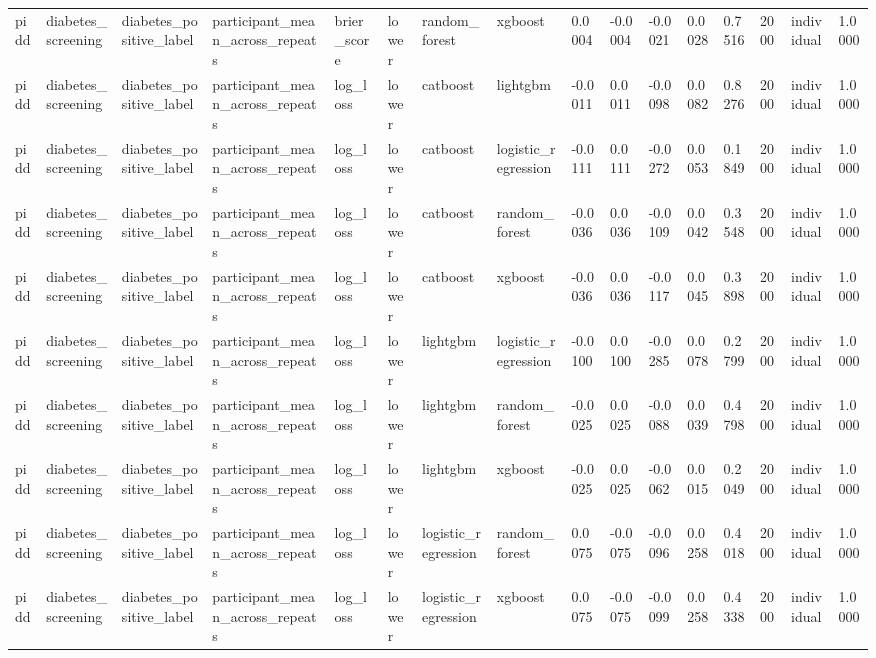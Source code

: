 \begin{tabular}{llllllllllllllll}
pidd & diabetes\_screening & diabetes\_positive\_label & participant\_mean\_across\_repeats & brier\_score & lower & random\_forest & xgboost & 0.0004 & -0.0004 & -0.0021 & 0.0028 & 0.7516 & 2000 & individual & 1.0000 \\
pidd & diabetes\_screening & diabetes\_positive\_label & participant\_mean\_across\_repeats & log\_loss & lower & catboost & lightgbm & -0.0011 & 0.0011 & -0.0098 & 0.0082 & 0.8276 & 2000 & individual & 1.0000 \\
pidd & diabetes\_screening & diabetes\_positive\_label & participant\_mean\_across\_repeats & log\_loss & lower & catboost & logistic\_regression & -0.0111 & 0.0111 & -0.0272 & 0.0053 & 0.1849 & 2000 & individual & 1.0000 \\
pidd & diabetes\_screening & diabetes\_positive\_label & participant\_mean\_across\_repeats & log\_loss & lower & catboost & random\_forest & -0.0036 & 0.0036 & -0.0109 & 0.0042 & 0.3548 & 2000 & individual & 1.0000 \\
pidd & diabetes\_screening & diabetes\_positive\_label & participant\_mean\_across\_repeats & log\_loss & lower & catboost & xgboost & -0.0036 & 0.0036 & -0.0117 & 0.0045 & 0.3898 & 2000 & individual & 1.0000 \\
pidd & diabetes\_screening & diabetes\_positive\_label & participant\_mean\_across\_repeats & log\_loss & lower & lightgbm & logistic\_regression & -0.0100 & 0.0100 & -0.0285 & 0.0078 & 0.2799 & 2000 & individual & 1.0000 \\
pidd & diabetes\_screening & diabetes\_positive\_label & participant\_mean\_across\_repeats & log\_loss & lower & lightgbm & random\_forest & -0.0025 & 0.0025 & -0.0088 & 0.0039 & 0.4798 & 2000 & individual & 1.0000 \\
pidd & diabetes\_screening & diabetes\_positive\_label & participant\_mean\_across\_repeats & log\_loss & lower & lightgbm & xgboost & -0.0025 & 0.0025 & -0.0062 & 0.0015 & 0.2049 & 2000 & individual & 1.0000 \\
pidd & diabetes\_screening & diabetes\_positive\_label & participant\_mean\_across\_repeats & log\_loss & lower & logistic\_regression & random\_forest & 0.0075 & -0.0075 & -0.0096 & 0.0258 & 0.4018 & 2000 & individual & 1.0000 \\
pidd & diabetes\_screening & diabetes\_positive\_label & participant\_mean\_across\_repeats & log\_loss & lower & logistic\_regression & xgboost & 0.0075 & -0.0075 & -0.0099 & 0.0258 & 0.4338 & 2000 & individual & 1.0000 \\

\end{tabular}
